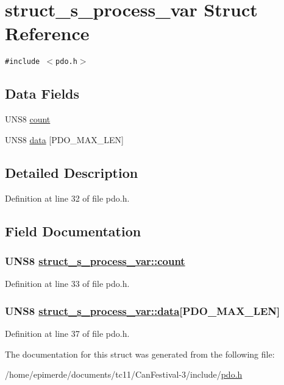 \hypertarget{structstruct__s__process__var}{
\section{struct\_\-s\_\-process\_\-var Struct Reference}
\label{structstruct__s__process__var}
}
{\tt \#include $<$pdo.h$>$}

\subsection*{Data Fields}
\begin{CompactItemize}
\item 
UNS8 \hyperlink{structstruct__s__process__var_f5110cf5f12faa435cb992cc96e7ff6b}{count}
\item 
UNS8 \hyperlink{structstruct__s__process__var_8790415d8a6886dadbb02c5f145bb543}{data} \mbox{[}PDO\_\-MAX\_\-LEN\mbox{]}
\end{CompactItemize}


\subsection{Detailed Description}




Definition at line 32 of file pdo.h.

\subsection{Field Documentation}
\hypertarget{structstruct__s__process__var_f5110cf5f12faa435cb992cc96e7ff6b}{
\subsubsection[count]{\setlength{\rightskip}{0pt plus 5cm}UNS8 \hyperlink{structstruct__s__process__var_f5110cf5f12faa435cb992cc96e7ff6b}{struct\_\-s\_\-process\_\-var::count}}}
\label{structstruct__s__process__var_f5110cf5f12faa435cb992cc96e7ff6b}




Definition at line 33 of file pdo.h.\hypertarget{structstruct__s__process__var_8790415d8a6886dadbb02c5f145bb543}{
\subsubsection[data]{\setlength{\rightskip}{0pt plus 5cm}UNS8 \hyperlink{structstruct__s__process__var_8790415d8a6886dadbb02c5f145bb543}{struct\_\-s\_\-process\_\-var::data}\mbox{[}PDO\_\-MAX\_\-LEN\mbox{]}}}
\label{structstruct__s__process__var_8790415d8a6886dadbb02c5f145bb543}




Definition at line 37 of file pdo.h.

The documentation for this struct was generated from the following file:\begin{CompactItemize}
\item 
/home/epimerde/documents/tc11/Can\-Festival-3/include/\hyperlink{pdo_8h}{pdo.h}\end{CompactItemize}
